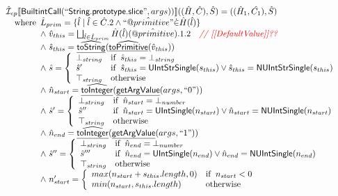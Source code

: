 \documentclass{article}
\makeatletter
\newcommand{\SF}[1]{\mbox{\textsf{#1}}}
\newcommand{\comment}[1]{\textit{#1}}
\newcommand{\wherec}[1]{{\rm where}\begin{array}[t]{l}#1\end{array}}
\newcommand{\ifc}[1]{{\rm if}\begin{array}[t]{l}#1\end{array}}
\newcommand{\owc}{{\rm otherwise}}
\newcommand{\aI}{\hat{\mathcal{I}}}
\newcommand{\lbr}{\llbracket}
\newcommand{\rbr}{\rrbracket}
\newcommand{\hf}[1]{\underline{\sf #1}}
\newcommand{\ahf}[1]{\widehat{\underline{\sf #1}}}
\newcommand{\avarprop}[1]{\hat{@#1}}
\def\inred{\color{red}}
\def\inred{\color{red}}
\makeatother
\begin{document}
\[\begin{array}{l}
\aI _{cp}\lbr \SF{BuiltintCall}(``\SF{String.prototype.slice}",args))\rbr((\hat{H},\hat{C}), \hat{S})
  = ((\hat{H}_1, \hat{C_1}), \hat{S})\\
\quad\wherec{ 
  \hat{L}_{prim} = \{ \hat{l} \mid \hat{l} \in \hat{C}.2 \land ``\avarprop{primitive}" \dot{\in}\hat{H}(\hat{l}) \}\\
  \land\ \hat{v}_{this} = \bigsqcup_{\hat{l} \in \hat{L}_{prim}} \hat{H}(\hat{l})(\avarprop{primitive}).1.2
    \quad\comment{{\inred // [[DefaultValue]]??}}\\
  \land\ \hat{s}_{this} = \ahf{toString}(\ahf{toPrimitive}(\hat{v}_{this}))\\
  \land\ \hat{s} = \left\{\begin{array}{ll}
      \bot_{string} & \ifc{\hat{s}_{this} = \bot_{string}}\\
      \hat{s}' & \ifc{\hat{s}_{this} = \SF{UIntStrSingle}(s_{this}) \lor \hat{s}_{this} = \SF{NUIntStrSingle}(s_{this}) }\\
      \top_{string} & \owc
    \end{array}\right.\\
  \land\ \hat{n}_{start} = \ahf{toInteger}(\hf{getArgValue}(args, ``0"))\\  
  \land\ \hat{s}' = \left\{\begin{array}{ll}
      \bot_{string} & \ifc{\hat{n}_{start} = \bot_{number}}\\
      \hat{s}'' & \ifc{\hat{n}_{start} = \SF{UIntSingle}(n_{start}) \lor \hat{n}_{start} = \SF{NUIntSingle}(n_{start}) }\\
      \top_{string} & \owc
    \end{array}\right.\\
  \land\ \hat{n}_{end} = \ahf{toInteger}(\hf{getArgValue}(args, ``1"))\\  
  \land\ \hat{s}'' = \left\{\begin{array}{ll}
      \bot_{string} & \ifc{\hat{n}_{end} = \bot_{number}}\\
      \hat{s}''' & \ifc{\hat{n}_{end} = \SF{UIntSingle}(n_{end}) \lor \hat{n}_{end} = \SF{NUIntSingle}(n_{end}) }\\
      \top_{string} & \owc
    \end{array}\right.\\
  \land\ n_{start}'= \left\{\begin{array}{ll}
      max(n_{start} + s_{this}.length, 0) & \ifc{n_{start} < 0}\\
      min(n_{start}, s_{this}.length) & \owc
    \end{array}\right.\\
}
\end{array}\]
\end{document}
